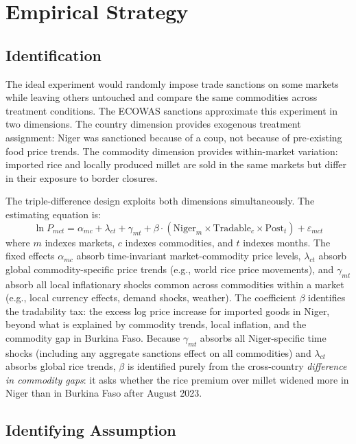\documentclass[12pt]{article}
\begin{document}


\section{Empirical Strategy}

\subsection{Identification}

The ideal experiment would randomly impose trade sanctions on some markets while leaving others untouched and compare the same commodities across treatment conditions. The ECOWAS sanctions approximate this experiment in two dimensions. The country dimension provides exogenous treatment assignment: Niger was sanctioned because of a coup, not because of pre-existing food price trends. The commodity dimension provides within-market variation: imported rice and locally produced millet are sold in the same markets but differ in their exposure to border closures.

The triple-difference design exploits both dimensions simultaneously. The estimating equation is:
\begin{equation}
\ln P_{mct} = \alpha_{mc} + \lambda_{ct} + \gamma_{mt} + \beta \cdot (\text{Niger}_m \times \text{Tradable}_c \times \text{Post}_t) + \varepsilon_{mct}
\label{eq:main}
\end{equation}
where $m$ indexes markets, $c$ indexes commodities, and $t$ indexes months. The fixed effects $\alpha_{mc}$ absorb time-invariant market-commodity price levels, $\lambda_{ct}$ absorb global commodity-specific price trends (e.g., world rice price movements), and $\gamma_{mt}$ absorb all local inflationary shocks common across commodities within a market (e.g., local currency effects, demand shocks, weather). The coefficient $\beta$ identifies the tradability tax: the excess log price increase for imported goods in Niger, beyond what is explained by commodity trends, local inflation, and the commodity gap in Burkina Faso. Because $\gamma_{mt}$ absorbs all Niger-specific time shocks (including any aggregate sanctions effect on all commodities) and $\lambda_{ct}$ absorbs global rice trends, $\beta$ is identified purely from the cross-country \textit{difference in commodity gaps}: it asks whether the rice premium over millet widened more in Niger than in Burkina Faso after August 2023.

\subsection{Identifying Assumption}
\end{document}
